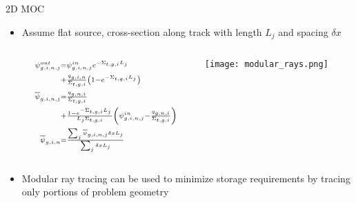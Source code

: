 
\begin{frame}[t]{2D MOC}
    
    \begin{itemize}
        \item Assume flat source, cross-section along track with 
        length $L_j$ and spacing $\delta x$
        \begin{columns}
            \begin{column}{0.6\textwidth}
                \begin{align*}\scriptstyle
                \psi^{out}_{g,i,n,j} &\scriptstyle = \psi^{in}_{g,i,n,j}e^{-\Sigma_{t,g,i} 
                    L_j} 
                \\\scriptstyle
                &\scriptstyle + \frac{q_{g,i,n}}{\Sigma_{t,g,i}}\left(1 - 
                e^{-\Sigma_{t,g,i}L_j}\right) \\\scriptstyle
                \overline{\psi}_{g,i,n,j} &\scriptstyle = 
                \frac{q_{g,n,i}}{\Sigma_{t,g,i}} 
                \\\scriptstyle
                &\scriptstyle + \frac{1 - e^{-\Sigma_{t,g,i} 
                        L_j}}{L_j\Sigma_{t,g,i}}\left(\psi^{in}_{g,i,n,j} - 
                \frac{q_{g,n,i}}{\Sigma_{t,g,i}}\right) \\\scriptstyle
                \overline{\psi}_{g,i,n} &\scriptstyle = \frac{\sum_j 
                    \overline{\psi}_{g,i,n,j} \delta x L_j}{\sum_j \delta x L_j}
                \end{align*}
            \end{column}
            \begin{column}{0.4\textwidth}
                \texttt{[image: modular\_rays.png]}
            \end{column}
        \end{columns}
        \item Modular ray tracing can be used to minimize storage requirements by 
        tracing only portions of problem geometry
    \end{itemize}
    
\end{frame} 


